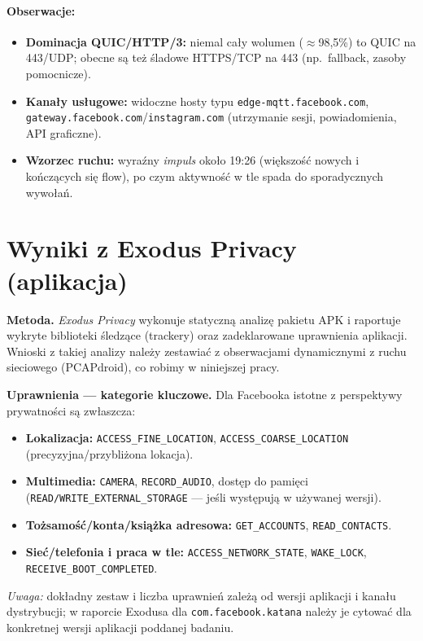 \paragraph{Obserwacje:}
\begin{itemize}
  \item \textbf{Dominacja QUIC/HTTP/3:} niemal cały wolumen ($\approx$98{,}5\%) to QUIC na 443/UDP; obecne są też śladowe HTTPS/TCP na 443 (np.\ fallback, zasoby pomocnicze).
  \item \textbf{Kanały usługowe:} widoczne hosty typu \texttt{edge-mqtt.facebook.com}, \texttt{gateway.facebook.com}/\texttt{instagram.com} (utrzymanie sesji, powiadomienia, API graficzne).
  \item \textbf{Wzorzec ruchu:} wyraźny \emph{impuls} około 19{:}26 (większość nowych i kończących się flow), po czym aktywność w tle spada do sporadycznych wywołań.
\end{itemize}

\section{Wyniki z Exodus Privacy (aplikacja)}
\textbf{Metoda.} \emph{Exodus Privacy} wykonuje statyczną analizę pakietu APK i raportuje wykryte biblioteki śledzące (trackery) oraz zadeklarowane uprawnienia aplikacji. Wnioski z takiej analizy należy zestawiać z obserwacjami dynamicznymi z ruchu sieciowego (PCAPdroid), co robimy w niniejszej pracy.

\textbf{Uprawnienia — kategorie kluczowe.} Dla Facebooka istotne z perspektywy prywatności są zwłaszcza:
\begin{itemize}
  \item \textbf{Lokalizacja:} \texttt{ACCESS\_FINE\_LOCATION}, \texttt{ACCESS\_COARSE\_LOCATION} (precyzyjna/przybliżona lokacja).
  \item \textbf{Multimedia:} \texttt{CAMERA}, \texttt{RECORD\_AUDIO}, dostęp do pamięci (\texttt{READ/WRITE\_EXTERNAL\_STORAGE} — jeśli występują w używanej wersji).
  \item \textbf{Tożsamość/konta/książka adresowa:} \texttt{GET\_ACCOUNTS}, \texttt{READ\_CONTACTS}.
  \item \textbf{Sieć/telefonia i praca w tle:} \texttt{ACCESS\_NETWORK\_STATE}, \texttt{WAKE\_LOCK}, \texttt{RECEIVE\_BOOT\_COMPLETED}.
\end{itemize}
\emph{Uwaga:} dokładny zestaw i liczba uprawnień zależą od wersji aplikacji i kanału dystrybucji; w raporcie Exodusa dla \texttt{com.facebook.katana} należy je cytować dla konkretnej wersji aplikacji poddanej badaniu.

